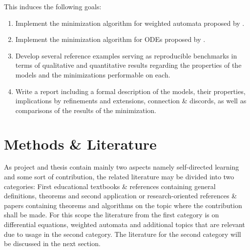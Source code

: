 \documentclass[11pt, rgb]{scrartcl}
\begin{document}
This induces the following goals:
\begin{enumerate}
 \item Implement the minimization algorithm for weighted automata proposed by \autocite{Kiefer2013OnTC}.
 \item Implement the minimization algorithm for ODEs proposed by \autocite{Cardelli2017MaximalAO}.
 \item Develop several reference examples serving as reproducible benchmarks in terms of qualitative and quantitative results regarding the properties of the models and the minimizations performable on each.
 \item Write a report including a formal description of the models, their properties, implications by refinements and extensions, connection \& discords, as well as comparisons of the results of the minimization.
\end{enumerate}



\section{Methods \& Literature}
As project and thesis contain mainly two aspects namely self-directed learning and some sort of contribution, the related literature may be divided into two categories: First educational textbooks \& references containing general definitions, theorems and second application or research-oriented references \& papers containing theorems and algorithms on the topic where the contribution shall be made. For this scope the literature from the first category is on differential equations, weighted automata and additional topics that are relevant due to usage in the second category. The literature for the second category will be discussed in the next section. \\
\end{document}
